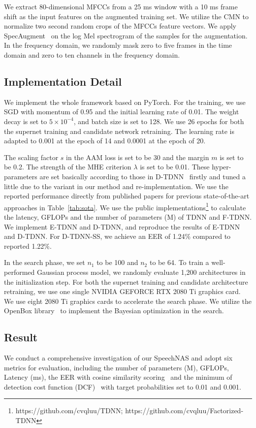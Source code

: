 \documentclass{article}
\begin{document}
We extract 80-dimensional MFCCs from a 25 ms window with a 10 ms frame shift as the input features on the augmented training set. We utilize the CMN to normalize two second random crops of the MFCCs feature vectors. We apply SpecAugment~\cite{park2019specaugment} on the log Mel spectrogram of the samples for the augmentation. In the frequency domain, we randomly mask zero to five frames in the time domain and zero to ten channels in the frequency domain.

\subsection{Implementation Detail}\label{sec:exper_impl}
We implement the whole framework based on PyTorch. For the training, we use SGD with momentum of 0.95 and the initial learning rate of 0.01. The weight decay is set to $5\times 10^{-4}$, and batch size is set to 128. We use 26 epochs for both the supernet training and candidate network retraining. The learning rate is adapted to 0.001 at the epoch of 14 and 0.0001 at the epoch of 20.  

The scaling factor $s$ in the AAM loss is set to be 30 and the margin $m$ is set to be 0.2. The strength of the MHE criterion $\lambda$ is set to be 0.01. These hyper-parameters are set basically according to those in D-TDNN~\cite{yu2020densely} firstly and tuned a little due to the variant in our method and re-implementation. We use the reported performance directly from published papers for previous state-of-the-art approaches in Table~\ref{tab:sota}. We use the public implementations\footnote{https://github.com/cvqluu/TDNN; https://github.com/cvqluu/Factorized-TDNN} to calculate the latency, GFLOPs and the number of parameters (M) of TDNN and F-TDNN. We implement E-TDNN and D-TDNN, and reproduce the results of E-TDNN and D-TDNN. For D-TDNN-SS, we achieve an EER of 1.24\% compared to reported 1.22\%.

In the search phase, we set $n_1$ to be 100 and $n_2$ to be 64. To train a well-performed Gaussian process model, we randomly evaluate 1,200 architectures in the initialization step. For both the supernet training and candidate architecture retraining, we use one single NVIDIA GEFORCE RTX 2080 Ti graphics card. We use eight 2080 Ti graphics cards to accelerate the search phase. We utilize the OpenBox library~\cite{li2021openbox} to implement the Bayesian optimization in the search. 

\subsection{Result}\label{sec:exper_result}
We conduct a comprehensive investigation of our SpeechNAS and adopt six metrics for evaluation, including the number of parameters (M), GFLOPs, Latency (ms), the EER with cosine similarity scoring~\cite{snyder2019speaker} and the minimum of detection cost function (DCF)~\cite{snyder2019speaker} with target probabilities set to 0.01 and 0.001. 
\end{document}
